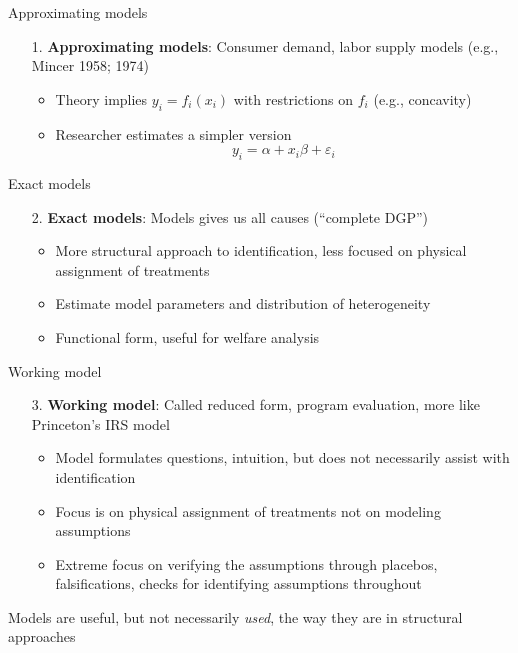 \documentclass{beamer}
\begin{document}
\begin{frame}{Approximating models}

  \begin{enumerate}
    \item[1. ] \textbf{Approximating models}: Consumer demand, labor supply models (e.g., Mincer 1958; 1974)
          \begin{itemize}
            \item Theory implies $y_i=f_i(x_i)$ with restrictions on $f_i$ (e.g., concavity)
            \item Researcher estimates a simpler version $$y_i = \alpha + x_i \beta + \varepsilon_i$$
          \end{itemize}
  \end{enumerate}

\end{frame}

\begin{frame}{Exact models}

  \begin{enumerate}
    \item[2. ] \textbf{Exact models}: Models gives us all causes (``complete DGP'')
          \begin{itemize}
            \item More structural approach to identification, less focused on physical assignment of treatments
            \item Estimate model parameters and distribution of heterogeneity
            \item Functional form, useful for welfare analysis
          \end{itemize}
  \end{enumerate}

\end{frame}

\begin{frame}{Working model}

  \begin{enumerate}
    \item[3. ] \textbf{Working model}: Called reduced form, program evaluation, more like Princeton's IRS model
          \begin{itemize}
            \item Model formulates questions, intuition, but does not necessarily assist with identification
            \item Focus is on physical assignment of treatments not on modeling assumptions
            \item Extreme focus on verifying the assumptions through placebos, falsifications, checks for identifying assumptions throughout
          \end{itemize}
  \end{enumerate}

  \bigskip

Models are useful, but not necessarily \emph{used}, the way they are in structural approaches

\end{frame}
\end{document}
